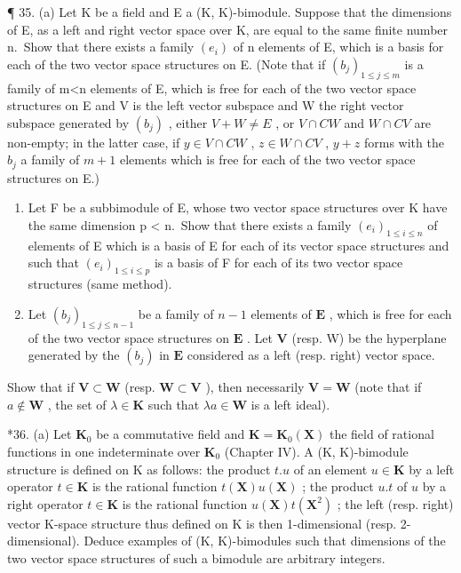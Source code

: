 ¶ 35. (a) Let K be a field and E a (K, K)-bimodule. Suppose that the dimensions of E, as a left and right vector space over K, are equal to the same finite number n.~Show that there exists a family \((e_{i})\) of n elements of E, which is a basis for each of the two vector space structures on E. (Note that if \((b_{j})_{1\leq j\leq m}\) is a family of m\textless n elements of E, which is free for each of the two vector space structures on E and V is the left vector subspace and W the right vector subspace generated by \((b_{j})\) , either \(V+W\neq E\) , or \(V\cap CW\) and \(W\cap CV\) are non-empty; in the latter case, if \(y\in V\cap CW\) , \(z\in W\cap CV\) , \(y+z\) forms with the \(b_{j}\) a family of \(m+1\) elements which is free for each of the two vector space structures on E.)

\begin{enumerate}
\def\labelenumi{(\alph{enumi})}
\setcounter{enumi}{1}
\item
  Let F be a subbimodule of E, whose two vector space structures over K have the same dimension p \textless{} n.~Show that there exists a family \((e_{i})_{1 \leqslant i \leqslant n}\) of elements of E which is a basis of E for each of its vector space structures and such that \((e_{i})_{1 \leqslant i \leqslant p}\) is a basis of F for each of its two vector space structures (same method).
\item
  Let \((b_{j})_{1\leqslant j\leqslant n - 1}\) be a family of \(n - 1\) elements of \(\mathbf{E}\) , which is free for each of the two vector space structures on \(\mathbf{E}\) . Let \(\mathbf{V}\) (resp. W) be the hyperplane generated by the \((b_{j})\) in \(\mathbf{E}\) considered as a left (resp. right) vector space.
\end{enumerate}

Show that if \(\mathbf{V} \subset \mathbf{W}\) (resp. \(\mathbf{W} \subset \mathbf{V}\) ), then necessarily \(\mathbf{V} = \mathbf{W}\) (note that if \(a \notin \mathbf{W}\) , the set of \(\lambda \in \mathbf{K}\) such that \(\lambda a \in \mathbf{W}\) is a left ideal).

*36. (a) Let \(\mathbf{K}_0\) be a commutative field and \(\mathbf{K} = \mathbf{K}_0(\mathbf{X})\) the field of rational functions in one indeterminate over \(\mathbf{K}_0\) (Chapter IV). A (K, K)-bimodule structure is defined on K as follows: the product \(t.u\) of an element \(u \in \mathbf{K}\) by a left operator \(t \in \mathbf{K}\) is the rational function \(t(\mathbf{X})u(\mathbf{X})\) ; the product \(u.t\) of \(u\) by a right operator \(t \in \mathbf{K}\) is the rational function \(u(\mathbf{X})t(\mathbf{X}^2)\) ; the left (resp. right) vector K-space structure thus defined on K is then 1-dimensional (resp. 2-dimensional). Deduce examples of (K, K)-bimodules such that dimensions of the two vector space structures of such a bimodule are arbitrary integers.

